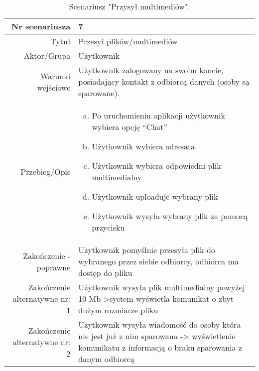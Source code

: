 \documentclass[12pt,a4paper]{article}
\begin{document}
\begin{table} [H]
\centering
\begin{tabular}{|r|p{9cm}|} \hline
Nr scenariusza & 7 \\
\hline
Tytuł & Przesył plików/multimediów \\
\hline
Aktor/Grupa & Użytkownik \\
\hline
Warunki wejściowe & Użytkownik zalogowany na swoim koncie, posiadający kontakt z odbiorcą danych (osoby są sparowane).  \\
\hline
Przebieg/Opis & 
\begin{enumerate}[a)]
\item Po uruchomieniu aplikacji użytkownik wybiera opcję “Chat”
\item Użytkownik  wybiera adresata 
\item Użytkownik wybiera odpowiedni plik multimedialny
\item Użytkownik uploaduje wybrany plik 
\item Użytkownik wysyła wybrany plik za pomocą przycisku
\end{enumerate}
\\
\hline
Zakończenie - poprawne & Użytkownik pomyślnie przesyła plik do wybranego przez siebie odbiorcy, odbiorca ma dostęp do pliku  
\\ 
\hline
Zakończenie alternatywne nr: 1 & Użytkownik wysyła plik multimedialny powyżej 10 Mb->system wyświetla komunikat o zbyt dużym rozmiarze pliku
\\
\hline
Zakończenie alternatywne nr: 2 & Użytkownik wysyła wiadomość do osoby która nie jest już z nim sparowana -> wyświetlenie komunikatu z informacją o braku sparowania z danym odbiorcą
\\
\hline
\end{tabular}
\caption{Scenariusz "Przysył multimediów".}
\label{table:7}
\end{table}
\end{document}
